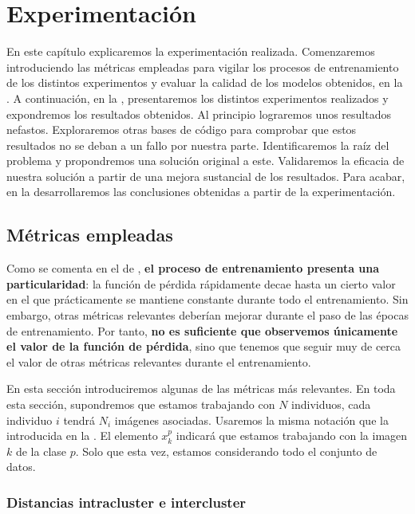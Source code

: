 \chapter{Experimentación} \label{ich:Experimentación}

En este capítulo explicaremos la experimentación realizada. Comenzaremos introduciendo las métricas empleadas para vigilar los procesos de entrenamiento de los distintos experimentos y evaluar la calidad de los modelos obtenidos, en la . A continuación, en la , presentaremos los distintos experimentos realizados y expondremos los resultados obtenidos. Al principio lograremos unos resultados nefastos. Exploraremos otras bases de código para comprobar que estos resultados no se deban a un fallo por nuestra parte. Identificaremos la raíz del problema y propondremos una solución original a este. Validaremos la eficacia de nuestra solución a partir de una mejora sustancial de los resultados. Para acabar, en la  desarrollaremos las conclusiones obtenidas a partir de la experimentación.

\section{Métricas empleadas} \label{isec:metricas_teoria}

Como se comenta en el  de \cite{informatica:principal}, \textbf{el proceso de entrenamiento presenta una particularidad}: la función de pérdida rápidamente decae hasta un cierto valor en el que prácticamente se mantiene constante durante todo el entrenamiento. Sin embargo, otras métricas relevantes deberían mejorar durante el paso de las épocas de entrenamiento. Por tanto, \textbf{no es suficiente que observemos únicamente el valor de la función de pérdida}, sino que tenemos que seguir muy de cerca el valor de otras métricas relevantes durante el entrenamiento.

En esta sección introduciremos algunas de las métricas más relevantes. En toda esta sección, supondremos que estamos trabajando con $N$ individuos, cada individuo $i$ tendrá $N_i$ imágenes asociadas. Usaremos la misma notación que la introducida en la . El elemento $x_k^p$ indicará que estamos trabajando con la imagen $k$ de la clase $p$. Solo que esta vez, estamos considerando todo el conjunto de datos.


\subsection{Distancias intracluster e intercluster} \label{isubs:teoria_distancia_intra_inter_cluster}

